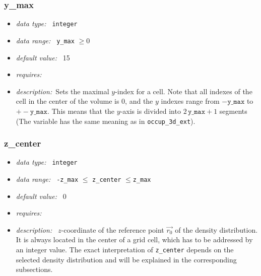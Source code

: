 \documentclass[a4paper,10pt]{article}
\begin{document}
\begin{appendix}
\subsubsection{y\_max}
\label{hydoptnl:ymax}
\begin{itemize}
 \item \textit{data type:~} \texttt{integer}
 \item \textit{data range:~} \texttt{y\_max} $\ge0$
 \item \textit{default value:~} 15
 \item \textit{requires:~}
 \item \textit{description:~}Sets the maximal $y$-index for a cell. Note that
  all indexes of the cell in the center of the volume is 0, and the  $y$ 
  indexes range from $-\mathtt{y\_max}$ to $+-\mathtt{y\_max}$. This means that 
  the $y$-axis is divided into $2\, \mathtt{y\_max} +1$ segments (The variable 
  has the same meaning as in \texttt{occup\_3d\_ext}).
\end{itemize}

\subsubsection{z\_center}
\label{hydoptnl:zcenter}
\begin{itemize}
 \item \textit{data type:~} \texttt{integer}
 \item \textit{data range:~} \texttt{-z\_max} $ \leq$ \texttt{z\_center} 
  $\leq $\texttt{z\_max} 
 \item \textit{default value:~} 0
 \item \textit{requires:~} 
 \item \textit{description:~} $z$-coordinate of the reference point $\vec{r_0}$
  of the density distribution.  It is always located in the center of a grid 
  cell, which has to be addressed by an integer value. 
  The exact interpretation of \texttt{z\_center} depends on the selected 
  density distribution and will be 
  explained in the corresponding subsections.
\end{itemize}



\end{appendix}
\end{document}
